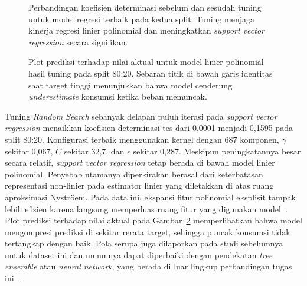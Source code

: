 \documentclass[conference]{IEEEtran}
\begin{document}
\begin{figure}[t]
\centering

\caption{Perbandingan koefisien determinasi sebelum dan sesudah tuning untuk model regresi terbaik pada kedua split. Tuning menjaga kinerja regresi linier polinomial dan meningkatkan \textit{support vector regression} secara signifikan.}
\label{fig:energy_tuning}
\end{figure}

\begin{figure}[t]
\centering

\caption{Plot prediksi terhadap nilai aktual untuk model linier polinomial hasil tuning pada split 80:20. Sebaran titik di bawah garis identitas saat target tinggi menunjukkan bahwa model cenderung \textit{underestimate} konsumsi ketika beban memuncak.}
\label{fig:energy_avp}
\end{figure}

Tuning \textit{Random Search} sebanyak delapan puluh iterasi pada \textit{support vector regression} menaikkan koefisien determinasi tes dari 0{,}0001 menjadi 0{,}1595 pada split 80:20. Konfigurasi terbaik menggunakan kernel dengan 687 komponen, $\gamma$ sekitar 0{,}067, $C$ sekitar 32{,}7, dan $\epsilon$ sekitar 0{,}287. Meskipun peningkatannya besar secara relatif, \textit{support vector regression} tetap berada di bawah model linier polinomial. Penyebab utamanya diperkirakan berasal dari keterbatasan representasi non-linier pada estimator linier yang diletakkan di atas ruang aproksimasi Nystr\"oem. Pada data ini, ekspansi fitur polinomial eksplisit tampak lebih efisien karena langsung memperluas ruang fitur yang digunakan model~\cite{Bourdeau2019,Pedregosa2011}. Plot prediksi terhadap nilai aktual pada Gambar~\ref{fig:energy_avp} memperlihatkan bahwa model mengompresi prediksi di sekitar rerata target, sehingga puncak konsumsi tidak tertangkap dengan baik. Pola serupa juga dilaporkan pada studi sebelumnya untuk dataset ini dan umumnya dapat diperbaiki dengan pendekatan \textit{tree ensemble} atau \textit{neural network}, yang berada di luar lingkup perbandingan tugas ini~\cite{Tien2022,Pham2020Energy,Wei2023Energy,Zhao2022Energy}.
\end{document}
